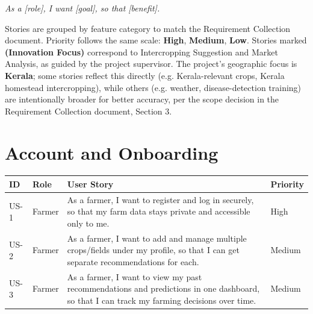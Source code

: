 \documentclass[12pt,a4paper]{article}
\begin{document}
\begin{center}
\textit{As a [role], I want [goal], so that [benefit].}
\end{center}

Stories are grouped by feature category to match the Requirement Collection document. Priority follows the same scale: \textbf{High}, \textbf{Medium}, \textbf{Low}. Stories marked \textbf{(Innovation Focus)} correspond to Intercropping Suggestion and Market Analysis, as guided by the project supervisor. The project's geographic focus is \textbf{Kerala}; some stories reflect this directly (e.g. Kerala-relevant crops, Kerala homestead intercropping), while others (e.g. weather, disease-detection training) are intentionally broader for better accuracy, per the scope decision in the Requirement Collection document, Section 3.

\section{Account and Onboarding}
\begin{longtable}{p{1.3cm} p{1.6cm} p{9.3cm} p{1.5cm}}
\toprule
\textbf{ID} & \textbf{Role} & \textbf{User Story} & \textbf{Priority} \\
\midrule
\endhead
US-1 & Farmer & As a farmer, I want to register and log in securely, so that my farm data stays private and accessible only to me. & High \\
US-2 & Farmer & As a farmer, I want to add and manage multiple crops/fields under my profile, so that I can get separate recommendations for each. & Medium \\
US-3 & Farmer & As a farmer, I want to view my past recommendations and predictions in one dashboard, so that I can track my farming decisions over time. & Medium \\
\bottomrule
\end{longtable}

\end{document}
